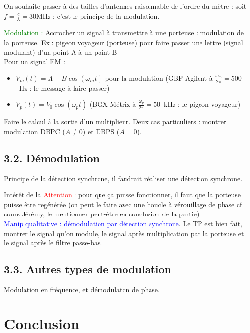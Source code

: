 \documentclass[french, a4paper, 10pt, twocolumn, landscape]{article}
\begin{document}
On souhaite passer à des tailles d'antennes raisonnable de l'ordre du mètre : soit $f=\frac{c}{\lambda}=30$MHz : c'est le principe de la modulation.

\textcolor{green}{Modulation :} Accrocher un signal à transmettre à une porteuse : modulation de la porteuse. Ex : pigeon voyageur (porteuse) pour faire passer une lettre (signal modulant) d'un point A à un point B\\

Pour un signal EM : 
\begin{itemize}
    \item $V_m(t)=A+B\cos(\omega_mt)$ pour la modulation (GBF Agilent à $\frac{\omega_m}{2\pi}=500$~Hz : le message à faire passer)
    \item $V_p(t) = V_0\cos(\omega_pt)$ (BGX Métrix à $\frac{\omega_p}{2\pi}=50$~kHz : le pigeon voyageur)
\end{itemize}

Faire le calcul à la sortie d'un multiplieur. Deux cas particuliers : montrer modulation DBPC ($A\neq0$) et DBPS ($A=0$).

\subsection*{3.2. Démodulation}

Principe de la détection synchrone, il faudrait réaliser une détection synchrone.

Intérêt de la 
\textcolor{red}{Attention :} pour que ça puisse fonctionner, il faut que la porteuse puisse être regénérée (on peut le faire avec une boucle à vérouillage de phase cf cours Jérémy, le mentionner peut-être en conclusion de la partie).\\

\textcolor{blue}{Manip qualitative : démodulation par détection synchrone}. Le TP est bien fait, montrer le signal qu'on module, le signal après multiplication par la porteuse et le signal après le filtre passe-bas.

\subsection*{3.3. Autres types de modulation}

Modulation en fréquence, et démodulaton de phase. 

\section*{Conclusion}
\end{document}
